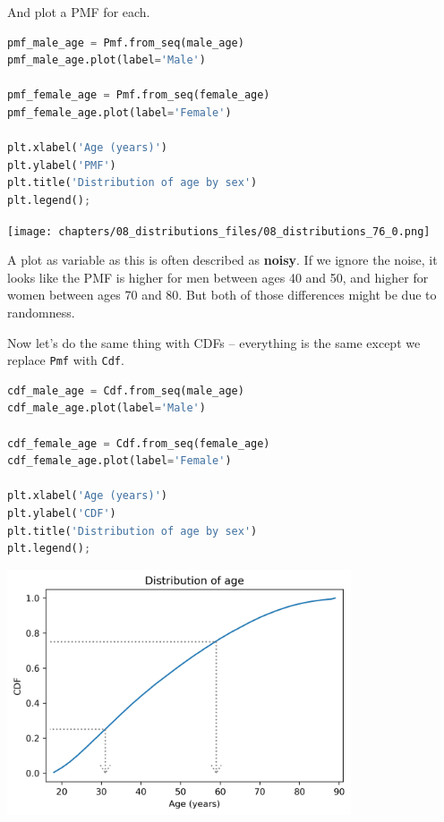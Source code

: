 And plot a PMF for each.

\begin{lstlisting}[language=Python,style=source]
pmf_male_age = Pmf.from_seq(male_age)
pmf_male_age.plot(label='Male')

pmf_female_age = Pmf.from_seq(female_age)
pmf_female_age.plot(label='Female')

plt.xlabel('Age (years)') 
plt.ylabel('PMF')
plt.title('Distribution of age by sex')
plt.legend();
\end{lstlisting}

\begin{center}
\texttt{[image: chapters/08\_distributions\_files/08\_distributions\_76\_0.png]}
\end{center}

A plot as variable as this is often described as \textbf{noisy}. If we
ignore the noise, it looks like the PMF is higher for men between ages
40 and 50, and higher for women between ages 70 and 80. But both of
those differences might be due to randomness.

Now let's do the same thing with CDFs -- everything is the same except
we replace \passthrough{\lstinline!Pmf!} with
\passthrough{\lstinline!Cdf!}.

\begin{lstlisting}[language=Python,style=source]
cdf_male_age = Cdf.from_seq(male_age)
cdf_male_age.plot(label='Male')

cdf_female_age = Cdf.from_seq(female_age)
cdf_female_age.plot(label='Female')

plt.xlabel('Age (years)') 
plt.ylabel('CDF')
plt.title('Distribution of age by sex')
plt.legend();
\end{lstlisting}

\begin{center}
\includegraphics[width=4in]{chapters/08_distributions_files/08_distributions_78_0.png}
\end{center}

